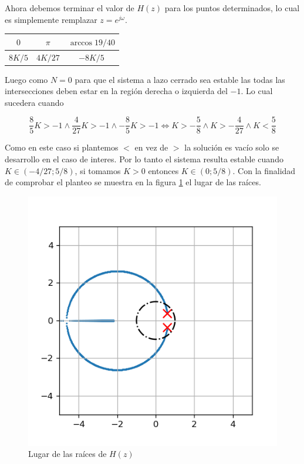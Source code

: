 \documentclass{article}
\begin{document}
        Ahora debemos terminar el valor de $H(z)$ para los puntos determinados, lo cual es simplemente remplazar $z=e^{j\omega}$.

        \begin{table}[H]
            \centering
            \begin{tabular}{|c|c|c|}
                \hline $0$ & $\pi$ & $\arccos{19/40}$ \\ 
                \hline $8K/5$ & $4K/27$ & $-8K/5$ \\
                \hline
            \end{tabular}
        \end{table}

        Luego como $N=0$ para que el sistema a lazo cerrado sea estable las todas las intersecciones deben estar en la región 
        derecha o izquierda del $-1$. Lo cual sucedera cuando 

        \begin{equation}
            \frac{8}{5}K > -1 \land \frac{4}{27}K > -1 \land -\frac{8}{5}K > -1 \Leftrightarrow
            K > -\frac{5}{8} \land K > -\frac{4}{27} \land K < \frac{5}{8}
        \end{equation}
        
        Como en este caso si plantemos $<$ en vez de $>$ la solución es vacío solo se desarrollo en el caso de interes. 
        Por lo tanto el sistema resulta estable cuando $K \in (-4/27;5/8)$, si tomamos $K>0$ entonces $K \in( 0 ; 5/8 )$.
        Con la finalidad de comprobar el planteo se muestra en la figura \ref{fig:12-rlocus} el lugar de las raíces.

        \begin{figure}
            \centering
            \includegraphics[width=.5\textwidth]{Img/12-rlocus.png}
            \caption{Lugar de las raíces de $H(z)$}
            \label{fig:12-rlocus}
        \end{figure}
\end{document}
